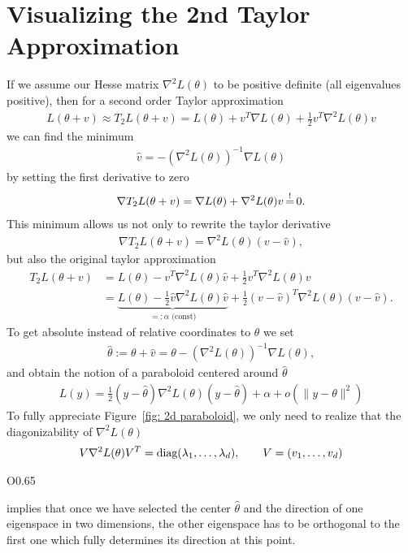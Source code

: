 \section{Visualizing the 2nd Taylor Approximation}
If we assume our Hesse matrix \(\nabla^2 L(\theta)\) to be positive definite
(all eigenvalues positive), then for a second order Taylor approximation
%
\begin{align*}
	L(\theta+v) \approx T_2L(\theta+v)
	= L(\theta) + v^T \nabla L(\theta) + \tfrac12 v^T \nabla^2 L(\theta) v
\end{align*}
%
we can find the minimum 
\begin{align*}
	\hat{v} = -(\nabla^2 L(\theta))^{-1}\nabla L(\theta)
\end{align*}
by setting the first derivative to zero
%
\begin{align*}
	\nabla T_2L(\theta+v) = \nabla L(\theta) + \nabla^2L(\theta) v \xeq{!} 0.
\end{align*}
%
This minimum allows us not only to rewrite the taylor derivative
%
\begin{align*}
	\nabla T_2L(\theta+v) = \nabla^2 L(\theta)(v-\hat{v}),
\end{align*}
%
but also the original taylor approximation
%
\begin{align*}
	T_2L(\theta+v)
	&= L(\theta) - v^T \nabla^2 L(\theta) \hat{v} + \tfrac12 v^T \nabla^2 L(\theta) v \\
	&= \underbrace{L(\theta) - \tfrac12 \hat{v} \nabla^2 L(\theta) \hat{v}}_{=: \alpha \text{ (const)}}
	+ \tfrac12 (v-\hat{v})^T \nabla^2 L(\theta)(v-\hat{v}).
\end{align*}
%
To get absolute instead of relative coordinates to \(\theta\) we set
%
\begin{align*}
	\hat{\theta} := \theta + \hat{v} = \theta -(\nabla^2 L(\theta))^{-1}\nabla L(\theta),
\end{align*}
%
and obtain the notion of a paraboloid centered around \(\hat{\theta}\)
%
\begin{align}\label{paraboloid approximation of L}
	L(y) = \tfrac12 (y- \hat{\theta}) \nabla^2 L(\theta) (y-\hat{\theta}) + \alpha + o(\|y-\theta\|^2)
\end{align}
%
To fully appreciate Figure~\ref{fig: 2d paraboloid}, we only need to realize
that the diagonizability of \(\nabla^2 L(\theta)\)
%
\begin{align}\label{diagnalization of the Hesse matrix}
	V \nabla^2 L(\theta) V^T
	= \text{diag}(\lambda_1,\dots,\lambda_d), \qquad V=(v_1,\dots, v_d)
\end{align}
%
\begin{wrapfigure}{O}{0.65\textwidth}
	\centering
	\def\svgwidth{0.65\textwidth}
	
	\caption{Assuming \(\hat{\theta}=0\), \(\lambda_1=1, \lambda_2=2\), \(v_1=(\sin(1), \cos(1))\)}
	\label{fig: 2d paraboloid}
\end{wrapfigure}
%
implies that once we have selected the center \(\hat{\theta}\) and the direction of
one eigenspace in two dimensions, the other eigenspace has to be
orthogonal to the first one which fully determines its direction at this point. 

